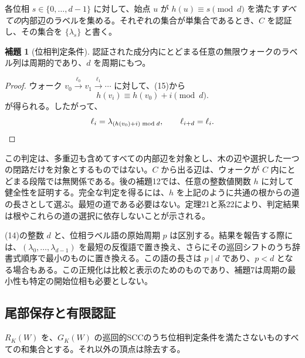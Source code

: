 \documentclass[11pt,reqno]{amsart}
\theoremstyle{definition}
\newtheorem{lemma}[theorem]{補題}
\theoremstyle{definition}
\theoremstyle{remark}
\begin{document}
各位相 \(s\in\{0,\ldots,d-1\}\) に対して、始点 \(u\) が \(h(u)\equiv s\pmod d\) を満たす\emph{すべての}内部辺のラベルを集める。それぞれの集合が単集合であるとき、\(C\) を認証し、その集合を \(\{\lambda_s\}\) と書く。

\begin{samepage}
\begin{lemma}[位相判定条件]\leavevmode\label{thm:7}
認証された成分内にとどまる任意の無限ウォークのラベル列は周期的であり、\(d\) を周期にもつ。
\label{thm-end:7}
\end{lemma}
\end{samepage}

\begin{proof}\leavevmode\label{proof:7}
ウォーク \(v_0\xrightarrow{\ell_0}v_1\xrightarrow{\ell_1}\cdots\) に対して、(15)から
\[
h(v_i)\equiv h(v_0)+i\pmod d.
\]
が得られる。したがって、
\[
\ell_i=\lambda_{(h(v_0)+i)\bmod d},
\qquad \ell_{i+d}=\ell_i.\qedhere
\]
\end{proof}

この判定は、多重辺も含めてすべての内部辺を対象とし、木の辺や選択した一つの閉路だけを対象とするものではない。\(C\) から出る辺は、ウォークが \(C\) 内にとどまる段階では無関係である。後の補題12では、任意の整数値関数 \(h\) に対して健全性を証明する。完全な判定を得るには、\(h\) を上記のように共通の根からの道の長さとして選ぶ。最短の道である必要はない。定理21と系22により、判定結果は根やこれらの道の選択に依存しないことが示される。

(14)の整数 \(d\) と、位相ラベル語の原始周期 \(p\) は区別する。結果を報告する際には、\((\lambda_0,\ldots,\lambda_{d-1})\) を最短の反復語で置き換え、さらにその巡回シフトのうち辞書式順序で最小のものに置き換える。この語の長さは \(p\mid d\) であり、\(p<d\) となる場合もある。この正規化は比較と表示のためのものであり、補題7は周期の最小性も特定の開始位相も必要としない。

\subsection{尾部保存と有限認証}\label{sec:3.3}

\(R_K(W)\) を、\(G_K(W)\) の巡回的SCCのうち位相判定条件を満たさないものすべての和集合とする。それ以外の頂点は除去する。
\end{document}

